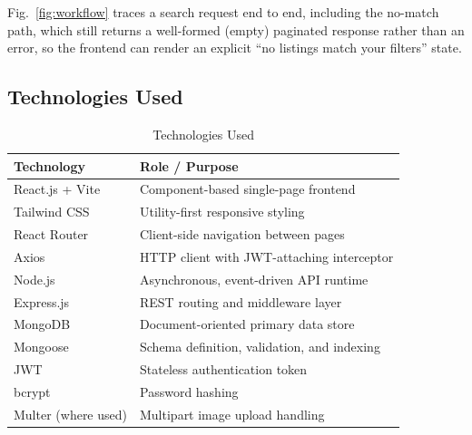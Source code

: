 \documentclass[10pt,twocolumn]{article}
\begin{document}
Fig.~\ref{fig:workflow} traces a search request end to end, including the no-match path, which still returns a well-formed (empty) paginated response rather than an error, so the frontend can render an explicit ``no listings match your filters'' state.

\subsection{Technologies Used}
\begin{table}[t]
\centering
\caption{Technologies Used}
\label{tab:tech}
\small
\begin{tabular}{@{}p{2.1cm}p{5.2cm}@{}}
\toprule
\textbf{Technology} & \textbf{Role / Purpose} \\
\midrule
React.js + Vite & Component-based single-page frontend \\
Tailwind CSS & Utility-first responsive styling \\
React Router & Client-side navigation between pages \\
Axios & HTTP client with JWT-attaching interceptor \\
Node.js & Asynchronous, event-driven API runtime \\
Express.js & REST routing and middleware layer \\
MongoDB & Document-oriented primary data store \\
Mongoose & Schema definition, validation, and indexing \\
JWT & Stateless authentication token \\
bcrypt & Password hashing \\
Multer (where used) & Multipart image upload handling \\
\bottomrule
\end{tabular}
\end{table}

\end{document}
